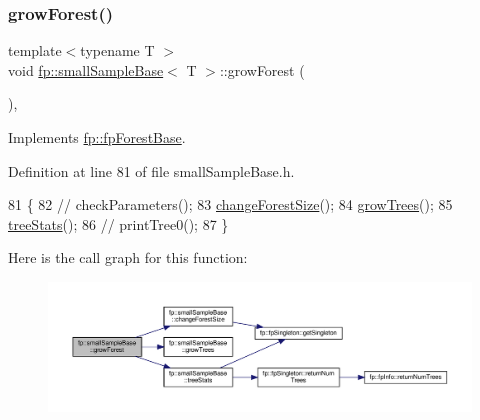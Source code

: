 \subsubsection{\texorpdfstring{grow\+Forest()}{growForest()}}
{\footnotesize\ttfamily template$<$typename T $>$ \\
void \hyperlink{classfp_1_1smallSampleBase}{fp\+::small\+Sample\+Base}$<$ T $>$\+::grow\+Forest (\begin{DoxyParamCaption}{ }\end{DoxyParamCaption})\hspace{0.3cm}{\ttfamily [inline]}, {\ttfamily [virtual]}}



Implements \hyperlink{classfp_1_1fpForestBase_a05b1d924a559536083ee7a8cf3ea542d}{fp\+::fp\+Forest\+Base}.



Definition at line 81 of file small\+Sample\+Base.\+h.


\begin{DoxyCode}
81                              \{
82                 \textcolor{comment}{//  checkParameters();}
83                 \hyperlink{classfp_1_1smallSampleBase_a92cbc7c3e09718ebe0704fbb16e44653}{changeForestSize}();
84                 \hyperlink{classfp_1_1smallSampleBase_a68653c8bb30ad84acc2f9c4b29c85d2e}{growTrees}();
85                 \hyperlink{classfp_1_1smallSampleBase_acc948b260715a190675a5d5ebedf0429}{treeStats}();
86                 \textcolor{comment}{//  printTree0();}
87             \}
\end{DoxyCode}
Here is the call graph for this function\+:\nopagebreak
\begin{figure}[H]
\begin{center}
\leavevmode
\includegraphics[width=350pt]{classfp_1_1smallSampleBase_a8c5b6a0f2c8aeb32a322cc5e237c60af_cgraph}
\end{center}
\end{figure}
\mbox{\label{classfp_1_1smallSampleBase_a68653c8bb30ad84acc2f9c4b29c85d2e}} 
